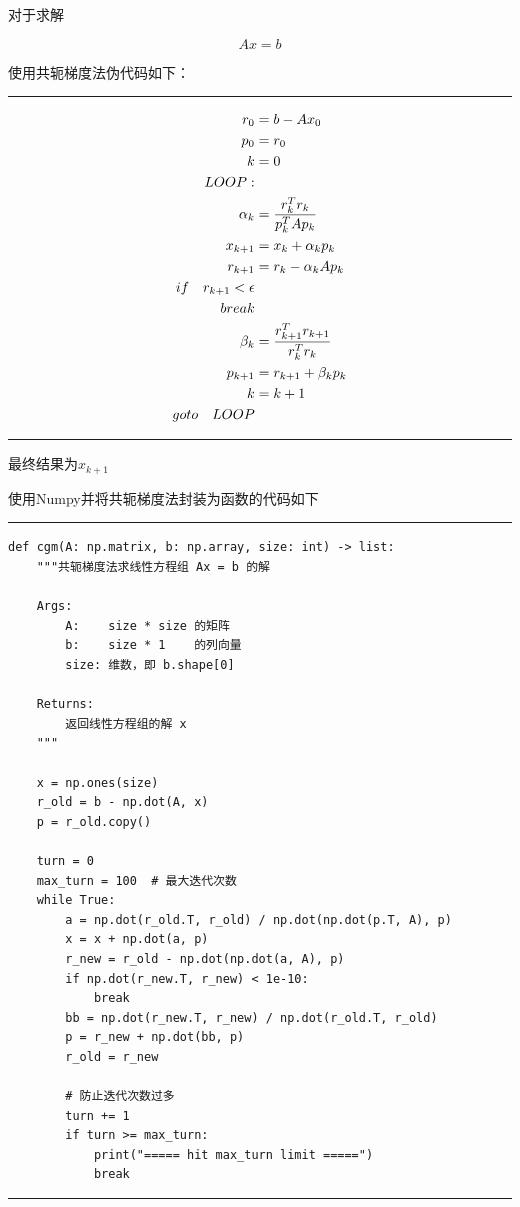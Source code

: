 对于求解

\begin{equation}
    A x = b
\end{equation}

使用共轭梯度法伪代码如下\cite{ref2}：

\rule{\textwidth}{0.01em}
\begin{align}
    \notag
    r_0 &=  b - A x_0 \\
    \notag
    p_0 &=  r_0 \\
    \notag
    k   &=  0 \\
    \notag
    LOOP: \\
    \notag
    \alpha_k    &=  \frac{r_k^T r_k}{p_k^T A p_k} \\
    \notag
    x_{k + 1}   &=  x_k + \alpha_k p_k \\
    \notag
    r_{k + 1}   &=  r_k - \alpha_k A p_k \\
    \notag
    if \quad r_{k + 1} < \epsilon \\
    \notag
    break \\
    \notag
    \beta_k     &=  \frac{r_{k + 1}^T r_{k + 1}}{r_k^T r_k} \\
    \notag
    p_{k + 1}   &=  r_{k + 1} + \beta_k p_k \\
    \notag
    k           &=  k + 1 \\
    \notag
    goto \quad LOOP
\end{align}
\rule{\textwidth}{0.01em}

最终结果为$x_{k + 1}$

使用Numpy并将共轭梯度法封装为函数的代码如下

\rule{\textwidth}{0.01em}
\begin{verbatim}
def cgm(A: np.matrix, b: np.array, size: int) -> list:
    """共轭梯度法求线性方程组 Ax = b 的解

    Args:
        A:    size * size 的矩阵
        b:    size * 1    的列向量
        size: 维数，即 b.shape[0]

    Returns:
        返回线性方程组的解 x
    """

    x = np.ones(size)
    r_old = b - np.dot(A, x)
    p = r_old.copy()

    turn = 0
    max_turn = 100  # 最大迭代次数
    while True:
        a = np.dot(r_old.T, r_old) / np.dot(np.dot(p.T, A), p)
        x = x + np.dot(a, p)
        r_new = r_old - np.dot(np.dot(a, A), p)
        if np.dot(r_new.T, r_new) < 1e-10:
            break
        bb = np.dot(r_new.T, r_new) / np.dot(r_old.T, r_old)
        p = r_new + np.dot(bb, p)
        r_old = r_new

        # 防止迭代次数过多
        turn += 1
        if turn >= max_turn:
            print("===== hit max_turn limit =====")
            break
\end{verbatim}
\rule{\textwidth}{0.01em}

